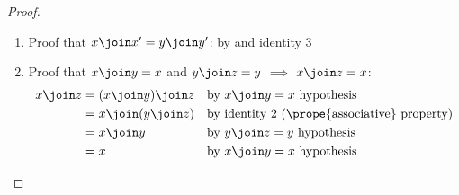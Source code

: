 \begin{proof}
\begin{enumerate}
\begin{enumerate}
      \item Proof that $x\join x' = y\join y'$: \label{item:boo_char_Ba_xxyy}
            by  and identity 3

      \item Proof that $x\join y=x$ and $y\join z=y$ $\implies$ $x\join z=x$: \label{item:boo_char_Ba_xzx}
        \begin{align*}
          x \join z
            &= (x\join y) \join z
            && \text{by $x\join y=x$ hypothesis}
          \\&= x\join (y \join z)
            && \text{by identity 2 (\prope{associative} property)}
          \\&= x\join y
            && \text{by $y\join z=y$ hypothesis}
          \\&= x
            && \text{by $x\join y=x$ hypothesis}
        \end{align*}


\end{enumerate}
\end{enumerate}
\end{proof}

